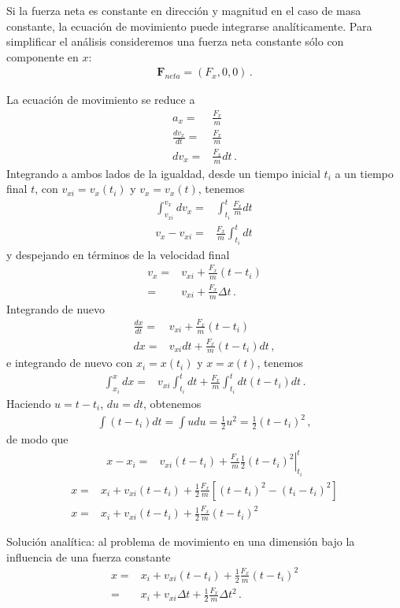 Si la fuerza neta es constante en dirección y magnitud en el caso de masa constante, la ecuación de movimiento puede integrarse analíticamente. Para simplificar el análisis consideremos una fuerza neta constante sólo con componente en $x$:
\begin{align}
  \mathbf{F}_{neta}=(F_x,0,0)\,.
\end{align}

La ecuación de movimiento se reduce a
\begin{align}
  a_x=&\frac{F_x}{m}\nonumber\\
\frac{dv_x}{dt}=&\frac{F_x}{m}\nonumber\\
{dv_x}=&\frac{F_x}{m}{dt}\,.
\end{align}
Integrando a ambos lados de la igualdad, desde un tiempo inicial $t_i$ a un tiempo final $t$, con $v_{xi}=v_x(t_i)$ y $v_x=v_x(t)$, tenemos
\begin{align}
  \int_{v_{xi}}^{v_x} d v_x =&\int_{t_i}^t \frac{F_x}{m}{dt}\nonumber\\
  v_x-v_{xi} =&\frac{F_x}{m}\int_{t_i}^t {dt}\,
\end{align}
y despejando en términos de la velocidad final
\begin{align}
  \label{eq:36}
  v_x =&v_{xi}+\frac{F_x}{m}(t-t_i)\nonumber\\
=&v_{xi}+\frac{F_x}{m}\Delta t\,.
\end{align}
Integrando de nuevo
\begin{align}
  \frac{dx}{dt} =&v_{xi}+\frac{F_x}{m}(t-t_i)\nonumber\\
  {dx} =&v_{xi}{dt}+\frac{F_x}{m}(t-t_i){dt}\,,
\end{align}
e integrando de nuevo con $x_i=x(t_i)$ y $x=x(t)$, tenemos
\begin{align}
  \int_{x_i}^{x}{dx} =&v_{xi}\int_{t_i}^t{dt}+\frac{F_x}{m}\int_{t_i}^t{dt}(t-t_i){dt}\,.
\end{align}
Haciendo $u=t-t_i$, $du=dt$, obtenemos
\begin{align}
\int(t-t_i)dt=\int u du=\frac{1}{2}u^2=\frac{1}{2}(t-t_i)^2\,,
\end{align}
de modo que
\begin{align}
  x-x_i=&v_{xi}(t-t_i)+\frac{F_x}{m}\left.\frac{1}{2}(t-t_i)^2\right|^t_{t_i}
\end{align}
\begin{align}
  x=&x_i+v_{xi}(t-t_i)+\frac{1}{2}\frac{F_x}{m}
  \left[
    (t-t_i)^2-(t_i-t_i)^2
  \right]\nonumber\\
  x=&x_i+v_{xi}(t-t_i)+\frac{1}{2}\frac{F_x}{m}(t-t_i)^2
\end{align}
\begin{frame}
  \begin{block}%
{Solución analítica:} al problema de movimiento en una dimensión bajo la influencia de una fuerza constante
\begin{align}
   x=&x_i+v_{xi}(t-t_i)+\frac{1}{2}\frac{F_x}{m}(t-t_i)^2\nonumber\\
   =&x_i+v_{xi}\Delta t+\frac{1}{2}\frac{F_x}{m}\Delta t^2\,.
\end{align}
  \end{block}
\end{frame}

